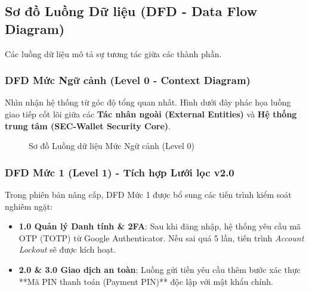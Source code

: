 \documentclass[11pt,a4paper]{article}
\begin{document}
\subsection{Sơ đồ Luồng Dữ liệu (DFD - Data Flow Diagram)}
Các luồng dữ liệu mô tả sự tương tác giữa các thành phần.

\subsubsection{DFD Mức Ngữ cảnh (Level 0 - Context Diagram)}
Nhìn nhận hệ thống từ góc độ tổng quan nhất. Hình dưới đây phác họa luồng giao tiếp cốt lõi giữa các \textbf{Tác nhân ngoài (External Entities)} và \textbf{Hệ thống trung tâm (SEC-Wallet Security Core)}.

\begin{figure}[H]
    \centering
    \caption{Sơ đồ Luồng dữ liệu Mức Ngữ cảnh (Level 0)}
\end{figure}

\subsubsection{DFD Mức 1 (Level 1) - Tích hợp Lưới lọc v2.0}
Trong phiên bản nâng cấp, DFD Mức 1 được bổ sung các tiến trình kiểm soát nghiêm ngặt:
\begin{itemize}
    \item \textbf{1.0 Quản lý Danh tính \& 2FA}: Sau khi đăng nhập, hệ thống yêu cầu mã OTP (TOTP) từ Google Authenticator. Nếu sai quá 5 lần, tiến trình \textit{Account Lockout} sẽ được kích hoạt.
    \item \textbf{2.0 \& 3.0 Giao dịch an toàn}: Luồng gửi tiền yêu cầu thêm bước xác thực **Mã PIN thanh toán (Payment PIN)** độc lập với mật khẩu chính.
\end{itemize}
\end{document}
